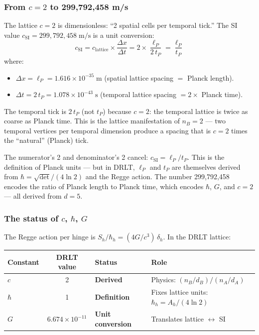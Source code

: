 \documentclass[12pt]{article}
\theoremstyle{remark}
\theoremstyle{definition}
\begin{document}
\subsubsection{From $c = 2$ to 299{,}792{,}458 m/s}

The lattice $c = 2$ is dimensionless: ``2 spatial cells per temporal tick.'' The SI value $c_\text{SI} = 299{,}792{,}458\;\text{m/s}$ is a unit conversion:
\begin{equation}
c_\text{SI} = c_\text{lattice} \times \frac{\Delta x}{\Delta t} = 2 \times \frac{\ell_P}{2\,t_P} = \frac{\ell_P}{t_P}
\end{equation}
where:
\begin{itemize}
\item $\Delta x = \ell_P = 1.616 \times 10^{-35}\;\text{m}$ (spatial lattice spacing $=$ Planck length).
\item $\Delta t = 2\,t_P = 1.078 \times 10^{-43}\;\text{s}$ (temporal lattice spacing $= 2 \times$ Planck time).
\end{itemize}

The temporal tick is $2\,t_P$ (not $t_P$) because $c = 2$: the temporal lattice is twice as coarse as Planck time. This is the lattice manifestation of $n_B = 2$ --- two temporal vertices per temporal dimension produce a spacing that is $c = 2$ times the ``natural'' (Planck) tick.

The numerator's 2 and denominator's 2 cancel: $c_\text{SI} = \ell_P/t_P$. This is the definition of Planck units --- but in DRLT, $\ell_P$ and $t_P$ are themselves derived from $\hbar = \sqrt{\det}/(4\ln 2)$ and the Regge action. The number 299{,}792{,}458 encodes the ratio of Planck length to Planck time, which encodes $\hbar$, $G$, and $c = 2$ --- all derived from $d = 5$.

\subsubsection{The status of $c$, $\hbar$, $G$}

The Regge action per hinge is $S_h/\hbar_h = (4G/c^3)\,\delta_h$. In the DRLT lattice:

\begin{center}
\begin{tabular}{lcll}
\hline
Constant & DRLT value & Status & Role \\
\hline
$c$ & 2 & \textbf{Derived} & Physics: $(n_B/d_B)/(n_A/d_A)$ \\
$\hbar$ & 1 & \textbf{Definition} & Fixes lattice units: $\hbar_h = A_h/(4\ln 2)$ \\
$G$ & $6.674 \times 10^{-11}$ & \textbf{Unit conversion} & Translates lattice $\leftrightarrow$ SI \\
\hline
\end{tabular}
\end{center}
\end{document}
